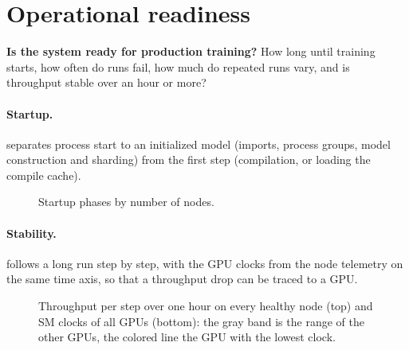 \section{Operational readiness}
\label{sec:operations}

\begin{question}
  \textbf{Is the system ready for production training?} How long until training starts, how often do runs
  fail, how much do repeated runs vary, and is throughput stable over an hour or more?
\end{question}

\paragraph{Startup.}  separates process start to an initialized model (imports, process
groups, model construction and sharding) from the first step (compilation, or loading the compile cache).

\begin{figure}[h]
  \centering{}
  \caption{Startup phases by number of nodes. }
  \label{fig:startup}
\end{figure}


\paragraph{Stability.}  follows a long run step by step, with the GPU clocks from the node
telemetry on the same time axis, so that a throughput drop can be traced to a GPU.

\begin{figure}[h]
  \centering{}
  \caption{Throughput per step over one hour on every healthy node (top) and SM clocks of
    all GPUs (bottom): the gray band is the range of the other GPUs, the colored line the GPU with the
    lowest clock.}
  \label{fig:stability}
\end{figure}

